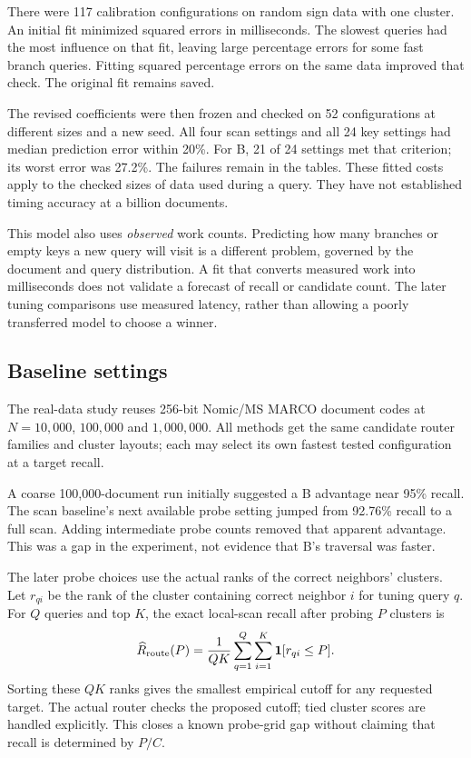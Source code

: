 There were 117 calibration configurations on random sign data with one cluster. An initial
fit minimized squared errors in milliseconds. The slowest queries had the most influence on that fit, leaving large percentage errors
for some fast branch queries. Fitting squared percentage errors on the same data improved
that check. The original fit remains saved.

The revised coefficients were then frozen and checked on 52 configurations at different sizes
and a new seed. All four scan settings and all 24 key settings had median prediction error
within 20\%. For B, 21 of 24 settings met that criterion; its worst error was 27.2\%.
The failures remain in the tables. These fitted costs apply to the checked sizes of data used during a query. They have not
established timing accuracy at a billion documents.

This model also uses \emph{observed} work counts. Predicting how many branches or empty keys a
new query will visit is a different problem, governed by the document and query distribution.
A fit that converts measured work into milliseconds does not validate a forecast of recall or
candidate count. The later tuning comparisons use measured latency, rather than allowing a
poorly transferred model to choose a winner.

\subsection{Baseline settings}
The real-data study reuses 256-bit Nomic/MS MARCO document codes at $N=10{,}000$, $100{,}000$
and $1{,}000{,}000$. All methods get the same candidate router families and cluster layouts;
each may select its own fastest tested configuration at a target recall.

A coarse 100,000-document run initially suggested a B advantage near 95\% recall. The scan
baseline's next available probe setting jumped from 92.76\% recall to a full scan. Adding
intermediate probe counts removed that apparent advantage. This was a gap in the experiment,
not evidence that B's traversal was faster.

The later probe choices use the actual ranks of the correct neighbors' clusters. Let
$r_{qi}$ be the rank of the cluster containing correct neighbor $i$ for tuning query $q$.
For $Q$ queries and top $K$, the exact local-scan recall after probing $P$ clusters is
\begin{equation}
\widehat{R}_{\rm route}(P)=\frac{1}{QK}
       \sum_{q=1}^{Q}\sum_{i=1}^{K}\mathbf 1[r_{qi}\le P].
\label{eq:empirical-route-rank}
\end{equation}
Sorting these $QK$ ranks gives the smallest empirical cutoff for any requested target.
The actual router checks the proposed cutoff; tied cluster scores are handled explicitly.
This closes a known probe-grid gap without claiming that recall is determined by $P/C$.

